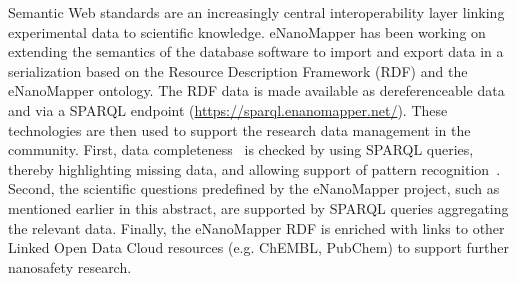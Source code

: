 \documentclass{llncs}
\begin{document}
Semantic Web standards are an increasingly central interoperability layer 
linking experimental data to scientific knowledge. eNanoMapper has been working 
on extending the semantics of the database software to import and export data in 
a serialization based on the Resource Description Framework (RDF) and the 
eNanoMapper ontology. The RDF data is made available as dereferenceable data and 
via a SPARQL endpoint (\url{https://sparql.enanomapper.net/}). These technologies 
are then used to support the research data management in the community. 
First, data completeness~\cite{MarcheseRobinson2016} is checked by using SPARQL queries, thereby highlighting 
missing data, and allowing support of pattern recognition~\cite{Willighagen2011}.
Second, the scientific questions predefined by the eNanoMapper project, 
such as mentioned earlier in this abstract, are supported by SPARQL queries 
aggregating the relevant data. Finally, the eNanoMapper RDF is enriched with links 
to other Linked Open Data Cloud resources (e.g. ChEMBL, PubChem) to support further 
nanosafety research.

{}

\end{document}
